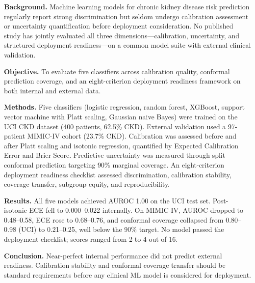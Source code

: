 \noindent\textbf{Background.}
Machine learning models for chronic kidney disease risk prediction regularly report strong discrimination but seldom undergo calibration assessment or uncertainty quantification before deployment consideration. No published study has jointly evaluated all three dimensions---calibration, uncertainty, and structured deployment readiness---on a common model suite with external clinical validation.

\medskip
\noindent\textbf{Objective.}
To evaluate five classifiers across calibration quality, conformal prediction coverage, and an eight-criterion deployment readiness framework on both internal and external data.

\medskip
\noindent\textbf{Methods.}
Five classifiers (logistic regression, random forest, XGBoost, support vector machine with Platt scaling, Gaussian naive Bayes) were trained on the UCI CKD dataset (400 patients, 62.5\% CKD). External validation used a 97-patient MIMIC-IV cohort (23.7\% CKD). Calibration was assessed before and after Platt scaling and isotonic regression, quantified by Expected Calibration Error and Brier Score. Predictive uncertainty was measured through split conformal prediction targeting 90\% marginal coverage. An eight-criterion deployment readiness checklist assessed discrimination, calibration stability, coverage transfer, subgroup equity, and reproducibility.

\medskip
\noindent\textbf{Results.}
All five models achieved AUROC 1.00 on the UCI test set. Post-isotonic ECE fell to 0.000--0.022 internally. On MIMIC-IV, AUROC dropped to 0.48--0.58, ECE rose to 0.68--0.76, and conformal coverage collapsed from 0.80--0.98 (UCI) to 0.21--0.25, well below the 90\% target. No model passed the deployment checklist; scores ranged from 2 to 4 out of 16.

\medskip
\noindent\textbf{Conclusion.}
Near-perfect internal performance did not predict external readiness. Calibration stability and conformal coverage transfer should be standard requirements before any clinical ML model is considered for deployment.
